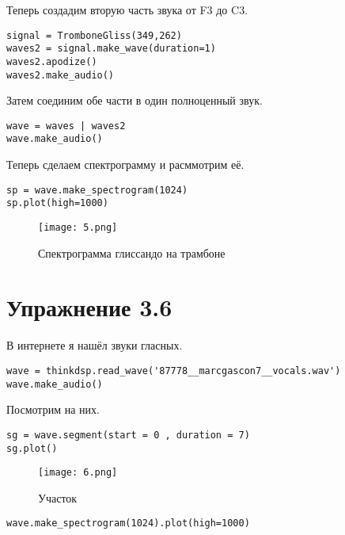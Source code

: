 \documentclass[a4paper,12pt]{report}
\begin{document}
Теперь создадим вторую часть звука от F3 до C3.

\begin{lstlisting}[caption=Создание второй части звука]
signal = TromboneGliss(349,262)
waves2 = signal.make_wave(duration=1)
waves2.apodize()
waves2.make_audio()
\end{lstlisting}

Затем соединим обе части в один полноценный звук.

\begin{lstlisting}[caption=Соединение двух частей звука]
wave = waves | waves2
wave.make_audio()
\end{lstlisting}

Теперь сделаем спектрограмму и расммотрим её.

\begin{lstlisting}[caption=Спектрограмма звука]
sp = wave.make_spectrogram(1024)
sp.plot(high=1000)
\end{lstlisting}

\begin{figure}[H]
        \centering
        \texttt{[image: 5.png]}
        \caption{Спектрограмма глиссандо на трамбоне}
        \label{fig:lab3_fig8}
\end{figure}


\chapter{Упражнение 3.6}

В интернете я нашёл звуки гласных.

\begin{lstlisting}[caption=Загрузка и прослушивание звука]
wave = thinkdsp.read_wave('87778__marcgascon7__vocals.wav')
wave.make_audio()
\end{lstlisting}

Посмотрим на них.

\begin{lstlisting}[caption=Участок]
sg = wave.segment(start = 0 , duration = 7)
sg.plot()
\end{lstlisting}

\begin{figure}[H]
        \centering
        \texttt{[image: 6.png]}
        \caption{Участок}
        \label{fig:lab3_fig9}
\end{figure}


\begin{lstlisting}[caption=Спектограмма]
wave.make_spectrogram(1024).plot(high=1000)
\end{lstlisting}
\end{document}
